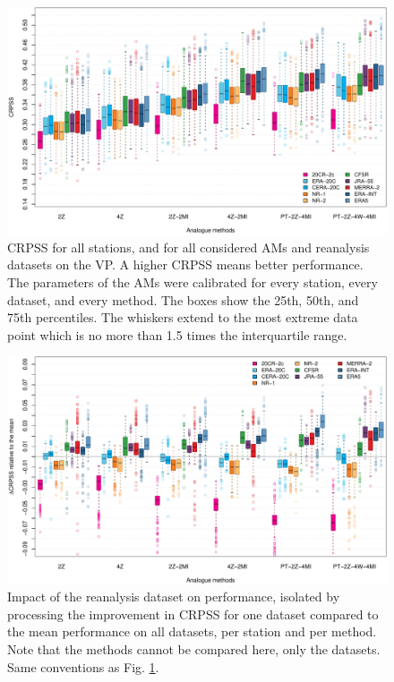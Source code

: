 \documentclass[alpha-refs]{wiley-article}
\begin{document}
\begin{figure}[bt]
    \centering
    \includegraphics[width=\textwidth]{figures/boxplot-per-method.pdf}
    \caption{CRPSS for all stations, and for all considered AMs and reanalysis datasets on the VP. A higher CRPSS means better performance. The parameters of the AMs were calibrated for every station, every dataset, and every method. The boxes show the 25th, 50th, and 75th percentiles. The whiskers extend to the most extreme data point which is no more than 1.5 times the interquartile range.}
    \label{fig:comparison_values}
\end{figure}

\begin{figure}[bt]
    \centering
    \includegraphics[width=\textwidth]{figures/boxplot-per-method-diff.pdf}
    \caption{Impact of the reanalysis dataset on performance, isolated by processing the improvement in CRPSS for one dataset compared to the mean performance on all datasets, per station and per method. Note that the methods cannot be compared here, only the datasets. Same conventions as Fig. \ref{fig:comparison_values}.}
    \label{fig:comparison_relative}
\end{figure}
\end{document}
